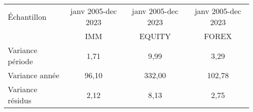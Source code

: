 \begin{tabular}{lccc}
\toprule
Échantillon & janv 2005-dec 2023 & janv 2005-dec 2023 & janv 2005-dec 2023 \\
      &  IMM &  EQUITY & FOREX \\ 
\cmidrule(r){1-1}\cmidrule(lr){2-2} \cmidrule(l){3-3} \cmidrule(l){4-4}
    Variance période  & 1,71   &   9,99     & 3,29  \\
    Variance année   & 96,10     &   332,00    & 102,78    \\
    Variance résidus  & 2,12    &   8,13   & 2,75  \\ 
\bottomrule
\end{tabular}
